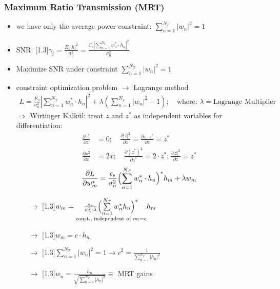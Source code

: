 \documentclass[a4paper, 10pt]{article}
\begin{document}
\subsubsection*{Maximum Ratio Transmission (MRT)}
\begin{itemize}
	\item we have only the average power constraint: $ \sum\limits_{n = 1}^{N_T} |w_n|^2 = 1 $
	\item SNR:  \scalebox{1.3}[1.3]{$\gamma	 _t = \frac{E_s|h|^2}{\sigma _n^2} = \frac{\mathcal{E}_s\left|\sum\limits_{n = 1}^{N_T}w_n^*\cdot h_n \right|^2}{\sigma _n^2} $} 
	\item Maximize SNR under constraint $ \sum\limits _{n = 1}^{N_T}|w_n|^2 = 1 $
	\item constraint optimization problem $\rightarrow $ Lagrange method
		\begin{align*}
			L = \frac{E_s}{\sigma _n^2}\left| \sum_{n = 1}^{N_T}w_n^*\cdot h_n \right |^2 + \lambda\left ( \sum_{n = 1}^{N_T}|w_n|^2 - 1\right ); \quad \text{where: } \lambda = \text{Lagrange Multiplier}
		\end{align*}
		$\Rightarrow$  Wirtinger Kalk\"ul: treat  $z$  and  $z^*$  as independent variables for differentiation:
		\begin{align*}
			\frac{\partial z^*}{\partial z} &= 0;\quad  \frac{\partial |z|^2}{\partial z} = \frac{\partial z\cdot z^*}{\partial z} = z^*\\
			\frac{\partial x^2}{\partial x} &= 2x; \quad \frac{\partial (z^*)^2}{\partial z^*} = 2\cdot z^*;  \frac{\partial |z|^2}{\partial z} = z^*
		\end{align*}
		\begin{align*}
			\frac{\partial L}{\partial w_m^*} = \frac{\epsilon _s}{\sigma _n^2}\Bigl ( \sum_{n = 1}^{N_T}w_n^*\cdot h_n\Bigr )^*h_m + \lambda w_m
		\end{align*}
		\begin{itemize}
			\item[$\rightarrow$] \scalebox{1.3}[1.3]{$   w_m =\underset{\text{const., independent of } m:=c}{\frac{\epsilon _s}{\sigma _n^2 \cdot \lambda}\Bigl ( \sum\limits_{n = 1}^{N_T}w_n^*h_n \Bigr )^*}h_m $}
			\item[$\rightarrow$] \scalebox{1.3}[1.3]{$  w_m = c\cdot h_m$}
			\item[$\rightarrow$] \scalebox{1.3}[1.3]{$ \sum\limits_{n = 1}^{N_T} |w_n|^2 = 1 \rightarrow c^2 = \frac{1}{\sum\limits_{n = 1}^{N_T}|h_n|^2}  $}
			\item[$\rightarrow$] \scalebox{1.3}[1.3]{$  w_n = \frac{h_n}{\sqrt{\sum\limits_{n = 1}^{N_T}|h_n|^2}} \equiv $} MRT gains 

\end{itemize}
\end{itemize}
\end{document}
